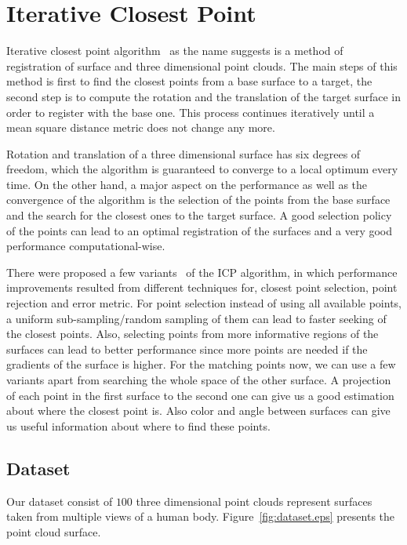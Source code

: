 \section{Iterative Closest Point}
\label{icp}

Iterative closest point algorithm~\cite{icpOr} as the name suggests is a method of registration of surface and three dimensional point clouds. The main steps of this method is first to find the closest points from a base surface to a target, the second step is to compute the rotation and the translation of the target surface in order to register with the base one. This process continues iteratively until a mean square distance metric does not change any more.

Rotation and translation of a three dimensional surface has six degrees of freedom, which the algorithm is guaranteed to converge to a local optimum every time. On the other hand, a major aspect on the performance as well as the convergence of the algorithm is the selection of the points from the base surface and the search for the closest ones to the target surface. A good selection policy of the points can lead to an optimal registration of the surfaces and a very good performance computational-wise.

There were proposed a few variants~\cite{icpVar} of the ICP algorithm, in which performance improvements resulted from different techniques for, closest point selection, point rejection and error metric. For point selection instead of using all available points, a uniform sub-sampling/random sampling of them can lead to faster seeking of the closest points. Also, selecting points from more informative regions of the surfaces can lead to better performance since more points are needed if the gradients of the surface is higher. For the matching points now, we can use a few variants apart from searching the whole space of the other surface. A projection of each point in the first surface to the second one can give us a good estimation about where the closest point is. Also color and angle between surfaces can give us useful information about where to find these points.

\subsection{Dataset}
Our dataset consist of $100$ three dimensional point clouds represent surfaces taken from multiple views of a human body. Figure~\ref{fig:dataset.eps} presents the point cloud surface.


